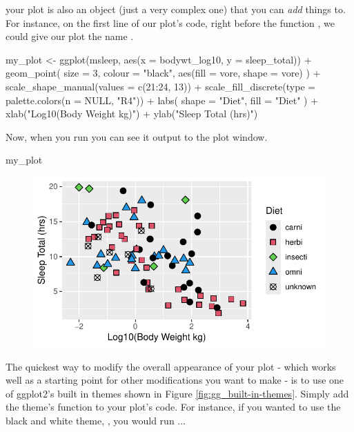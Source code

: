 \noindent
your plot is also an object (just a very complex one) that you can \textit{add} things to. For instance, on the first line of our plot's code, right before the function , we could give our plot the name .

\begin{inR}
my_plot <- ggplot(msleep, aes(x = bodywt_log10, y = sleep_total)) +
  geom_point(
    size = 3, colour = "black",
    aes(fill = vore, shape = vore)
  ) +
  scale_shape_manual(values = c(21:24, 13)) +
  scale_fill_discrete(type = palette.colors(n = NULL, "R4")) +
  labs(
    shape = "Diet",
    fill = "Diet"
  ) +
  xlab("Log10(Body Weight kg)") + ylab("Sleep Total (hrs)")
\end{inR}

\vspace{1em}

\noindent
Now, when you run  you can see it output to the plot window.

\begin{inR}
my_plot 
\end{inR}

\vspace{2em}

\begin{figure}[H]
\includegraphics[scale = .75]{graphics/ch2Figs/ggEx_32.pdf}
\end{figure}

The quickest way to modify the overall appearance of your plot - which works well as a starting point for other modifications you want to make - is to use one of ggplot2's built in themes shown in Figure \ref{fig:gg_built-in-themes}.  Simply add the theme's function to your plot's code.  For instance, if you wanted to use the black and white theme, , you would run ...

